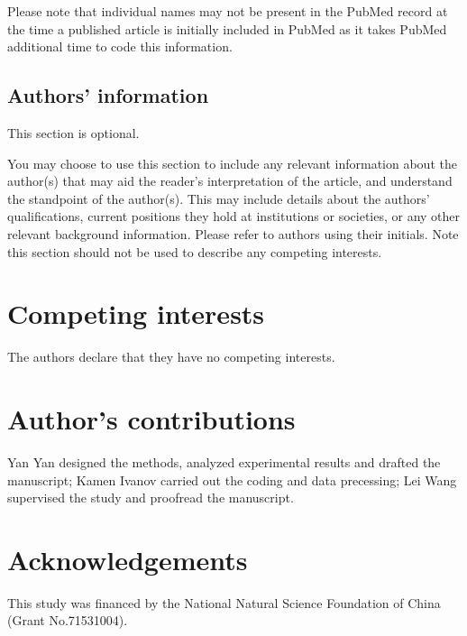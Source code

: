 \documentclass{bmcart}
\begin{document}
\begin{backmatter}
Please note that individual names may not be present in the PubMed record at the time a published article is initially included in PubMed as it takes PubMed additional time to code this information.

\subsection*{Authors' information}

This section is optional.

You may choose to use this section to include any relevant information about the author(s) that may aid the reader's interpretation of the article, and understand the standpoint of the author(s). This may include details about the authors' qualifications, current positions they hold at institutions or societies, or any other relevant background information. Please refer to authors using their initials. Note this section should not be used to describe any competing interests.


\section*{Competing interests}
  The authors declare that they have no competing interests.

\section*{Author's contributions}
Yan Yan designed the methods, analyzed experimental results and drafted the manuscript; Kamen Ivanov carried out the coding and data precessing; Lei Wang supervised the study and proofread the manuscript.

\section*{Acknowledgements}
 This study was financed by the National Natural Science Foundation of China (Grant No.71531004).
  


\end{backmatter}
\end{document}
